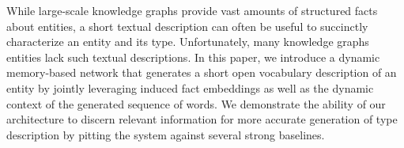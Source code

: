 While large-scale knowledge graphs provide vast amounts of structured facts about entities, a short textual description can often be useful to succinctly characterize an entity and its type. Unfortunately, many knowledge graphs entities lack such textual descriptions. In this paper, we introduce a dynamic memory-based network that generates a short open vocabulary description of an entity by jointly leveraging induced fact embeddings as well as the dynamic context of the generated sequence of words. We demonstrate the ability of our architecture to discern relevant information for more accurate generation of type description by pitting the system against several strong baselines.
